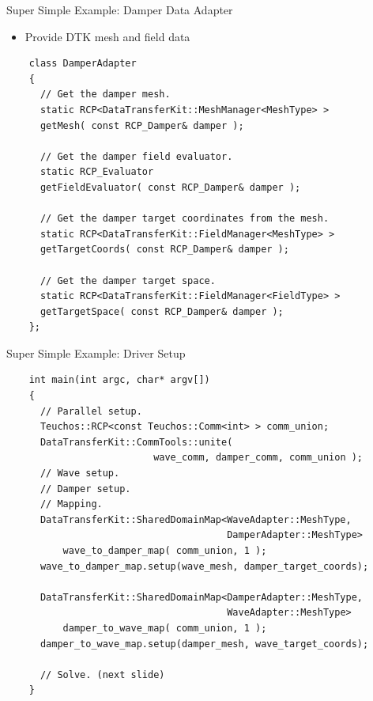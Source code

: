 \documentclass{beamer}
\begin{document}
\begin{frame}[fragile]{Super Simple Example: Damper Data Adapter}

  \begin{itemize}
  \item Provide DTK mesh and field data
  \end{itemize}
  
  \begin{lstlisting}
    class DamperAdapter
    {
      // Get the damper mesh.
      static RCP<DataTransferKit::MeshManager<MeshType> >
      getMesh( const RCP_Damper& damper );

      // Get the damper field evaluator.
      static RCP_Evaluator 
      getFieldEvaluator( const RCP_Damper& damper );

      // Get the damper target coordinates from the mesh.
      static RCP<DataTransferKit::FieldManager<MeshType> >
      getTargetCoords( const RCP_Damper& damper );

      // Get the damper target space.
      static RCP<DataTransferKit::FieldManager<FieldType> >
      getTargetSpace( const RCP_Damper& damper );
    };
  \end{lstlisting}

\end{frame}

\begin{frame}[fragile]{Super Simple Example: Driver Setup}

  \begin{lstlisting}
    int main(int argc, char* argv[])
    {
      // Parallel setup.
      Teuchos::RCP<const Teuchos::Comm<int> > comm_union;
      DataTransferKit::CommTools::unite( 
                          wave_comm, damper_comm, comm_union );
      // Wave setup.
      // Damper setup.
      // Mapping.
      DataTransferKit::SharedDomainMap<WaveAdapter::MeshType,
                                       DamperAdapter::MeshType>
          wave_to_damper_map( comm_union, 1 );
      wave_to_damper_map.setup(wave_mesh, damper_target_coords);

      DataTransferKit::SharedDomainMap<DamperAdapter::MeshType,
                                       WaveAdapter::MeshType>
          damper_to_wave_map( comm_union, 1 );
      damper_to_wave_map.setup(damper_mesh, wave_target_coords);

      // Solve. (next slide)
    }
  \end{lstlisting}

\end{frame}
\end{document}
